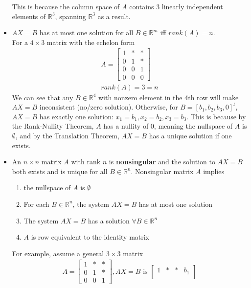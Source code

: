 \begin{itemize}
    This is because the column space of $A$ contains 3 linearly independent elements of $\mathbb{R}^3$, spanning $\mathbb{R}^3$ as a result.
  \item $AX = B$ has at most one solution for all $B \in \mathbb{R}^m$ iff $rank(A) = n$.\\
    For a $4 \times 3$ matrix with the echelon form
    \begin{align*}
      A = \begin{bmatrix}
        1 & * & *\\
        0 & 1 & *\\
        0 & 0 & 1\\
        0 & 0 & 0
      \end{bmatrix}
      \\
      rank(A) = 3 = n
    \end{align*}
    We can see that any $B \in \mathbb{R}^4$ with nonzero element in the 4th row will make $AX = B$ inconsistent (no/zero solution).
    Otherwise, for $B = [b_1, b_2, b_3, 0]^t$, $AX = B$ has exactly one solution: $x_1 = b_1, x_2 = b_2, x_3 = b_3$.
    This is because by the Rank-Nullity Theorem, $A$ has a nullity of $0$, meaning the nullspace of $A$ is $\emptyset$, and by the Translation Theorem, $AX = B$ has a unique solution if one exists.
  \item An $n \times n$ matrix $A$ with rank $n$ is \textbf{nonsingular} and the solution to $AX = B$ both exists and is unique for all $B \in \mathbb{R}^n$.
    Nonsingular matrix $A$ implies
    \begin{enumerate}[label={(\alph*)}]
      \item the nullspace of $A$ is $\emptyset$
      \item For each $B \in \mathbb{R}^n$, the system $AX = B$ has at most one solution
      \item The system $AX = B$ has a solution $\forall B \in \mathbb{R}^n$
      \item $A$ is row equivalent to the identity matrix
    \end{enumerate}
    For example, assume a general $3 \times 3$ matrix
    \begin{align*}
      A = \begin{bmatrix}
        1 & * & *\\
        0 & 1 & *\\
        0 & 0 & 1
      \end{bmatrix}
      ,
      AX = B \text{ is } \begin{bmatrix}
        1 & * & * & b_1\\

\end{bmatrix}
\end{align*}
\end{itemize}
